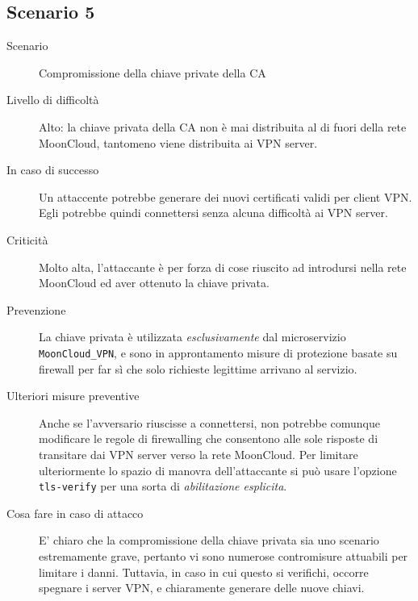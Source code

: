 \subsection{Scenario 5}
\begin{description}
    \item[Scenario]Compromissione della chiave private della CA
    \item[Livello di difficoltà]Alto: la chiave privata della CA 
    non è mai distribuita al di fuori della rete MoonCloud, tantomeno
    viene distribuita ai VPN server.
    \item[In caso di successo]Un attaccente potrebbe generare dei nuovi
    certificati validi per client VPN. Egli potrebbe quindi connettersi
    senza alcuna difficoltà ai VPN server.
    \item[Criticità]Molto alta, l'attaccante è per forza di cose riuscito 
    ad introdursi nella rete MoonCloud ed aver ottenuto la chiave privata. 
    \item[Prevenzione]La chiave privata è utilizzata \textit{esclusivamente}
    dal microservizio \texttt{MoonCloud\_VPN}, e sono in approntamento
    misure di protezione basate su firewall per far sì che
    solo richieste legittime arrivano al servizio.
    \item[Ulteriori misure preventive]Anche se l'avversario riuscisse a connettersi,
    non potrebbe
    comunque modificare le regole di firewalling che consentono
    alle sole risposte di transitare dai VPN server verso la rete MoonCloud.
    Per limitare ulteriormente lo spazio di manovra dell'attaccante
    si può usare l'opzione \texttt{tls-verify} per una sorta di \textit{abilitazione
    esplicita}.
    \item[Cosa fare in caso di attacco]E' chiaro che la compromissione della
    chiave privata sia uno scenario estremamente grave, pertanto vi sono
    numerose contromisure attuabili per limitare i danni. Tuttavia, in
    caso in cui questo si verifichi, occorre spegnare i server VPN, e
    chiaramente generare delle nuove chiavi.
\end{description}
